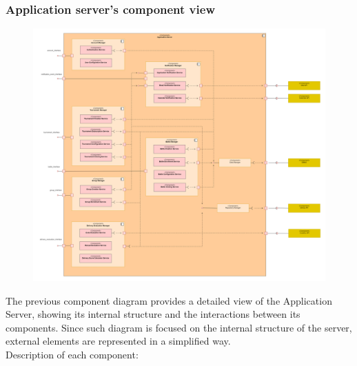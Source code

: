 \documentclass[../DD.tex]{subfiles}
\begin{document}
    \subsubsection*{Application server's component view}
        \begin{figure}[h!]
            \centering
            \hspace*{-3.5cm}
            \includegraphics[width=1.45\textwidth]{../assets/section_2/ApplicationServerComponentDiagram.png}
        \end{figure}
    \newpage
    \restoregeometry
    The previous component diagram provides a detailed view of the Application Server, showing its internal structure and the interactions between its components. Since such diagram is focused on the internal structure of the server, external elements are represented in a simplified way.\\
    Description of each component:
\end{document}

